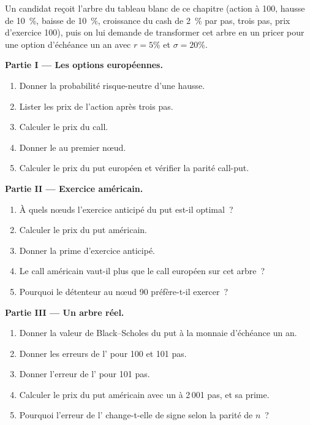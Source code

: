 \begin{problem}\label{pb:dv:the-binomial-model:1}
Un candidat reçoit l'arbre du tableau blanc de ce chapitre (action à 100, hausse de 10~\%,
baisse de 10~\%, croissance du cash de 2~\% par pas, trois pas, prix d'exercice 100), puis on lui demande de transformer
cet arbre en un pricer pour une option d'échéance un an avec $r=5\%$ et $\sigma=20\%$.

\medskip\noindent\textbf{Partie I --- Les options européennes.}
\begin{enumerate}
\item Donner la probabilité risque-neutre d'une hausse.
\item Lister les prix de l'action après trois pas.
\item Calculer le prix du call.
\item Donner le  au premier nœud.
\item Calculer le prix du put européen et vérifier la parité call-put.
\end{enumerate}

\medskip\noindent\textbf{Partie II --- Exercice américain.}
\begin{enumerate}[resume]
\item À quels nœuds l'exercice anticipé du put est-il optimal~?
\item Calculer le prix du put américain.
\item Donner la prime d'exercice anticipé.
\item Le call américain vaut-il plus que le call européen sur cet arbre~?
\item Pourquoi le détenteur au nœud 90 préfère-t-il exercer~?
\end{enumerate}

\medskip\noindent\textbf{Partie III --- Un arbre réel.}
\begin{enumerate}[resume]
\item Donner la valeur de Black--Scholes du put à la monnaie d'échéance un an.
\item Donner les erreurs de l' pour 100 et 101 pas.
\item Donner l'erreur de l' pour 101 pas.
\item Calculer le prix du put américain avec un  à 2\,001 pas, et sa prime.
\item Pourquoi l'erreur de l' change-t-elle de signe selon la parité de $n$~?
\end{enumerate}


\end{problem}

